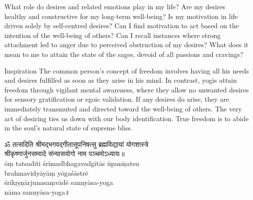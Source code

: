 

\newpage
\begin{mananam}{} 
\mananamtext What role do desires and related emotions play in my life? Are my desires healthy and constructive for my long-term well-being? Is my motivation in life driven solely by self-centred desires? Can I find motivation to act based on the intention of the well-being of others? Can I recall instances where strong attachment led to anger due to perceived obstruction of my desires? What does it mean to me to attain the state of the sages, devoid of all passions and cravings? 
\end{mananam}
\WritingHand{}
\begin{inspiration}{\mananamfont Inspiration}
\mananamtext The common person’s concept of freedom involves having all his needs and desires fulfilled as soon as they arise in his mind. In contrast, yogis attain freedom through vigilant mental awareness, where they allow no unwanted desires for sensory gratification or egoic validation. If any desires do arise, they are immediately transmuted and directed toward the well-being of others. The very act of desiring ties us down with our body identification. True freedom is to abide in the soul’s natural state of supreme bliss.
\end{inspiration}
\newpage

\begin{center}
  ॐ तत्सदिति श्रीमद्भगवद्गीतासूपनिषत्सु ब्रह्मविद्यायां योगशास्त्रे\\
  श्रीकृष्णार्जुनसम्वादे संन्यासयोगो नाम पञ्चमोऽध्यायः॥\\
  \arialUC\small ōṃ tatsaditi śrīmadbhagavadgītās ūpaniṣatsu \\brahmavidyāyāṃ yōgaśāstrē\\ śrīkṛṣṇārjunasaṃvādē sannyāsa-yoga\\nāma sannyāsa-yoga॥
\end{center}
\chapEnd
